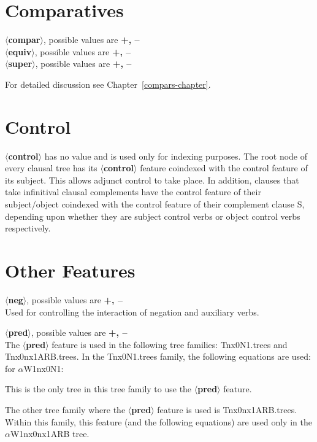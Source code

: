 \section{Comparatives}
{\bf $\langle$compar$\rangle$}, possible values are {\bf +, --}\\
{\bf $\langle$equiv$\rangle$}, possible values are {\bf +, --}\\
{\bf $\langle$super$\rangle$}, possible values are {\bf +, --}

For detailed discussion see Chapter~\ref{compars-chapter}.

\section{Control}
{\bf $\langle$control$\rangle$} has no value and is used only for indexing
purposes.  The root node of every clausal tree has its {\bf
$\langle$control$\rangle$} feature coindexed with the control feature of
its subject.  This allows adjunct control to take place. In addition,
clauses that take infinitival clausal complements have the control feature
of their subject/object coindexed with the control feature of their
complement clause S, depending upon whether they are subject control verbs
or object control verbs respectively.


\section{Other Features}
{\bf $\langle$neg$\rangle$}, possible values are {\bf +, --}\\
Used for controlling the interaction of negation and auxiliary verbs.

\noindent
{\bf $\langle$pred$\rangle$}, possible values are {\bf +, --}\\
The {\bf $\langle$pred$\rangle$} feature is used in the following tree
families: Tnx0N1.trees and Tnx0nx1ARB.trees.
In the Tnx0N1.trees family, the following equations are used:\\
for $\alpha$W1nx0N1:


This is the only tree in this tree family to use the 
{\bf $\langle$pred$\rangle$} feature.

The other tree family where the {\bf $\langle$pred$\rangle$} feature is
used is Tnx0nx1ARB.trees.  Within this family, this feature (and the
following equations) are used only in the $\alpha$W1nx0nx1ARB tree.

